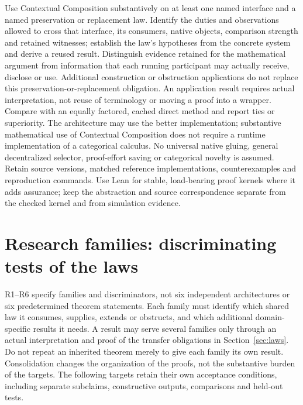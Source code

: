 \documentclass[11pt]{article}
\begin{document}
Use Contextual Composition substantively on at least one named interface and a named preservation or replacement law. Identify the duties and observations allowed to cross that interface, its consumers, native objects, comparison strength and retained witnesses; establish the law's hypotheses from the concrete system and derive a reused result. Distinguish evidence retained for the mathematical argument from information that each running participant may actually receive, disclose or use. Additional construction or obstruction applications do not replace this preservation-or-replacement obligation. An application result requires actual interpretation, not reuse of terminology or moving a proof into a wrapper. Compare with an equally factored, cached direct method and report ties or superiority. The architecture may use the better implementation; substantive mathematical use of Contextual Composition does not require a runtime implementation of a categorical calculus. No universal native gluing, general decentralized selector, proof-effort saving or categorical novelty is assumed. Retain source versions, matched reference implementations, counterexamples and reproduction commands. Use Lean for stable, load-bearing proof kernels where it adds assurance; keep the abstraction and source correspondence separate from the checked kernel and from simulation evidence.

\section{Research families: discriminating tests of the laws}\label{sec:families}
R1--R6 specify families and discriminators, not six independent architectures or six predetermined theorem statements. Each family must identify which shared law it consumes, supplies, extends or obstructs, and which additional domain-specific results it needs. A result may serve several families only through an actual interpretation and proof of the transfer obligations in Section~\ref{sec:laws}. Do not repeat an inherited theorem merely to give each family its own result. Consolidation changes the organization of the proofs, not the substantive burden of the targets. The following targets retain their own acceptance conditions, including separate subclaims, constructive outputs, comparisons and held-out tests.
\end{document}
